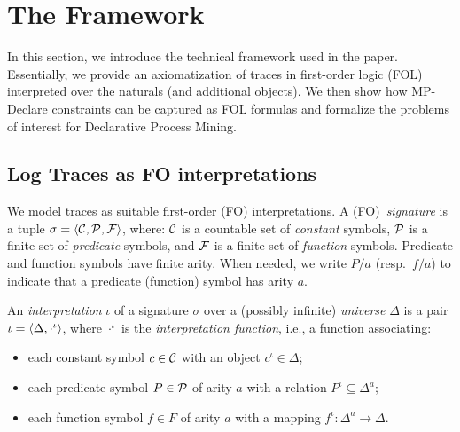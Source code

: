 \section{The Framework}

In this section, we introduce the technical framework used in the paper.
Essentially, we provide an axiomatization of traces in first-order logic
(FOL) interpreted over the naturals (and additional objects). We then show how MP-Declare constraints can be captured as FOL formulas and formalize the problems of interest for Declarative Process Mining.

\subsection{Log Traces as FO interpretations}
We model traces as suitable first-order (FO) interpretations.
A (FO)~\emph{signature} is a tuple $\sigma=\tup{\C,\P,\F}$, where:
$\C$ is a countable set of \emph{constant} symbols, $\P$ is a finite set of
\emph{predicate} symbols, and $\F$ is a finite set of \emph{function} symbols.
Predicate and function symbols have finite arity. When needed, we write $P/a$
(resp.~$f/a$) to indicate that a predicate (function) symbol has arity $a$.

An \emph{interpretation} $\iota$ of a signature $\sigma$ over a
(possibly infinite) \emph{universe} $\Delta$ is a pair
$\iota=\tup{\Delta,\cdot^\iota}$, where $\cdot^\iota$ is the
\emph{interpretation function}, i.e., a function associating:
	\begin{itemize}
		\item each constant symbol $c\in\C$ with an object $c^\iota\in\Delta$;
		\item each predicate symbol $P\in\P$ of arity $a$ with a relation
$P^\iota\subseteq \Delta^a$;
		\item each function symbol $f\in F$ of arity $a$ with a mapping
$f^\iota:\Delta^a\rightarrow\Delta$.
	\end{itemize}

